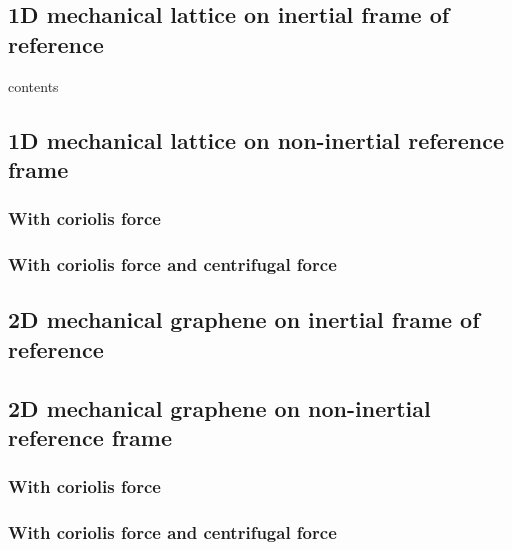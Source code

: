 \documentclass[../main.tex]{subfiles}
\begin{document}
\subsection{1D mechanical lattice on inertial frame of reference}



contents

\subsection{1D mechanical lattice on non-inertial reference frame}

\subsubsection{With coriolis force}

\subsubsection{With coriolis force and centrifugal force}

\subsection{2D mechanical graphene on inertial frame of reference}

\subsection{2D mechanical graphene on non-inertial reference frame}

\subsubsection{With coriolis force}

\subsubsection{With coriolis force and centrifugal force}
\end{document}
